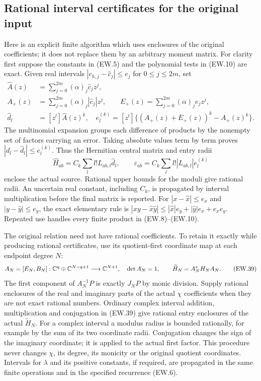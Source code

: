 \subsection{Rational interval certificates for the original input}

Here is an explicit finite algorithm which uses enclosures of the
original coefficients; it does not replace them by an arbitrary moment
matrix. For clarity first suppose the constants in (EW.5) and the
polynomial tests in (EW.10) are exact. Given real intervals
$|c_{h,j}-\widehat c_j|\le e_j$ for $0\le j\le2m$, set
\[
 \begin{split}
 \widehat A(z)&=\sum_{j=0}^{2m}(\alpha)_j\widehat c_jz^j,\\
 A_+(z)&=\sum_{j=0}^{2m}(\alpha)_j|\widehat c_j|z^j,
 \qquad E_+(z)=\sum_{j=0}^{2m}(\alpha)_je_jz^j,\\
 \widehat d_l&=[z^l]\widehat A(z)^k,\quad
 e_l^{(k)}=[z^l]\{(A_+(z)+E_+(z))^k-A_+(z)^k\}.
 \end{split}                                                   \tag{EW.37}
\]
The multinomial expansion groups each difference of products by
the nonempty set of factors carrying an error. Taking absolute values
term by term proves $|d_l-\widehat d_l|\le e_l^{(k)}$.
Thus the Hermitian central matrix and entry radii
\[
 \widehat H_{ab}=C_k\sum_l l!L_{ab,l}\widehat d_l,\qquad
 \varepsilon_{ab}=C_k\sum_l l!|L_{ab,l}|e_l^{(k)}            \tag{EW.38}
\]
enclose the actual source. Rational upper bounds for the moduli give
rational radii. An uncertain real constant, including $C_k$, is
propagated by interval multiplication before the final matrix is
reported. For $|x-\widehat x|\le e_x$ and
$|y-\widehat y|\le e_y$, the exact elementary rule is
$|xy-\widehat x\widehat y|\le|\widehat x|e_y+
|\widehat y|e_x+e_xe_y$. Repeated use handles every finite
product in (EW.8)--(EW.10).

The original relation need not have rational coefficients. To retain
it exactly while producing rational certificates, use its quotient-first
coordinate map at each endpoint degree $N$:
\[
 A_N=[E_N,B_N]:\mathbb C^q\oplus\mathbb C^{N-q+1}\longrightarrow\mathbb C^{N+1},
 \quad\det A_N=1,\qquad\widetilde H_N=A_N^*H_NA_N.
                                                               \tag{EW.39}
\]
The first component of $A_N^{-1}P$ is exactly $J_NP$ by monic
division. Supply rational enclosures of the real and imaginary parts
of the actual $\chi$ coefficients when they are not exact rational
numbers. Ordinary complex interval addition, multiplication and
conjugation in (EW.39) give rational entry enclosures of the actual
$\widetilde H_N$. For a complex interval a modulus radius is
bounded rationally, for example by the sum of its two coordinate
radii. Conjugation changes the sign of the imaginary coordinate;
it is applied to the actual first factor. This procedure never
changes $\chi$, its degree, its monicity or the original quotient
coordinates. Intervals for $\lambda$ and its positive constants,
if required, are propagated in the same finite operations and in the
specified recurrence (EW.6).

